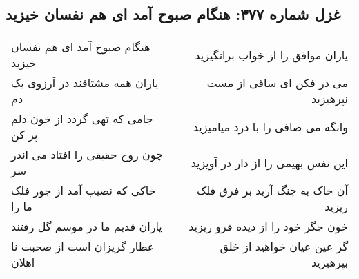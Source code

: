 \begin{center}
\section*{غزل شماره ۳۷۷: هنگام صبوح آمد ای هم نفسان خیزید}
\label{sec:377}
\begin{longtable}{l p{0.5cm} r}
هنگام صبوح آمد ای هم نفسان خیزید
&&
یاران موافق را از خواب برانگیزید
\\
یاران همه مشتاقند در آرزوی یک دم
&&
می در فکن ای ساقی از مست نپرهیزید
\\
جامی که تهی گردد از خون دلم پر کن
&&
وانگه می صافی را با درد میامیزید
\\
چون روح حقیقی را افتاد می اندر سر
&&
این نفس بهیمی را از دار در آویزید
\\
خاکی که نصیب آمد از جور فلک ما را
&&
آن خاک به چنگ آرید بر فرق فلک ریزید
\\
یاران قدیم ما در موسم گل رفتند
&&
خون جگر خود را از دیده فرو ریزید
\\
عطار گریزان است از صحبت نا اهلان
&&
گر عین عیان خواهید از خلق بپرهیزید
\\
\end{longtable}
\end{center}
